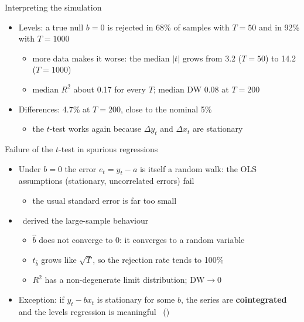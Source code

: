 \begin{frame}{Interpreting the simulation}
\itemsize{\small}
\begin{itemize}
    \item Levels: a true null $b = 0$ is rejected in 68\% of samples with $T = 50$ and in 92\% with $T = 1000$
    \begin{itemize}
        \item more data makes it worse: the median $|t|$ grows from 3.2 ($T = 50$) to 14.2 ($T = 1000$)
        \item median $R^2$ about 0.17 for every $T$; median DW 0.08 at $T = 200$
    \end{itemize}
    \item Differences: 4.7\% at $T = 200$, close to the nominal 5\%
    \begin{itemize}
        \item the $t$-test works again because $\Delta y_t$ and $\Delta x_t$ are stationary
    \end{itemize}
\end{itemize}
\end{frame}

\begin{frame}{Failure of the $t$-test in spurious regressions}
\itemsize{\small}
\begin{itemize}
    \item Under $b = 0$ the error $e_t = y_t - a$ is itself a random walk: the OLS assumptions (stationary, uncorrelated errors) fail
    \begin{itemize}
        \item the usual standard error is far too small
    \end{itemize}
    \item {}\ derived the large-sample behaviour
    \begin{itemize}
        \item $\hat b$ does not converge to 0: it converges to a random variable
        \item $t_{\hat b}$ grows like $\sqrt{T}$, so the rejection rate tends to 100\%
        \item $R^2$ has a non-degenerate limit distribution; $\mathrm{DW} \to 0$
    \end{itemize}
    \item Exception: if $y_t - b x_t$ is stationary for some $b$, the series are \textbf{cointegrated} and the levels regression is meaningful \ ()
\end{itemize}
\end{frame}

